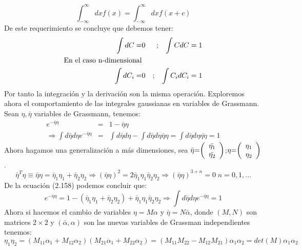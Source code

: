 \begin{equation}
\int_{-\infty}^{\infty}dxf(x)=\int_{-\infty}^{\infty}dxf(x+c)
\end{equation}
De este requerimiento se concluye que debemos tener:
\begin{eqnarray}
\int dC=&0&; \hspace{0.3 cm} \int CdC=1\\
\nonumber \text{En el caso n-dimensional}&&\\
\int dC_i=&0&; \hspace{0.3 cm} \int C_idC_i=1
\end{eqnarray}
Por tanto la integración y la derivación son la misma operación. Exploremos ahora el comportamiento de las integrales gaussianas en variables de Grassmann. Sean $\eta,\bar{\eta}$ variables de Grassmann, tenemos:
\begin{eqnarray}
e^{-\bar{\eta}\eta}&=&1-\bar{\eta}\eta\\
\Rightarrow\int d\bar{\eta}d\eta e^{-\bar{\eta}\eta}&=&\int d\bar{\eta}d\eta-\int d\bar{\eta}d\eta\bar{\eta}\eta=\int d\bar{\eta}d\eta\bar{\eta\eta}=1
\end{eqnarray}
Ahora hagamos una generalización a más dimensiones, sea $\text{\ensuremath{\bar{\eta}}=\ensuremath{\left(\begin{array}{c}
\bar{\eta_{1}}\\
\bar{\eta_{2}}
\end{array}\right)}}$;$\text{\ensuremath{\eta}=\ensuremath{\left(\begin{array}{c}
\eta_{1}\\
\eta_{2}
\end{array}\right)}}$.
\begin{equation}
\bar{\eta}^T\eta\equiv \bar{\eta}\eta=\bar{\eta}_1\eta_1+\bar{\eta}_2\eta_2\Rightarrow (\bar{\eta}\eta)^2=2\bar{\eta}_1\eta_1\bar{\eta}_2\eta_2\Rightarrow (\bar{\eta}\eta)^{3+n}=0 \;n=0,1,... 
\end{equation}
De la ecuación (2.158) podemos concluir que:
\begin{equation}
e^{-\bar{\eta}\eta}=1-(\bar{\eta}_1\eta_1+\bar{\eta}_2\eta_2)+\bar{\eta}_1\eta_1\bar{\eta}_2\eta_2\Rightarrow \int d\bar{\eta}d\eta e^{-\bar{\eta}\eta}=1
\end{equation}
Ahora si hacemos el cambio de variables $\eta=M\alpha$ y $\bar{\eta}=N\bar{\alpha}$, donde $(M,N)$ son matrices $2\times 2$ y $(\bar{\alpha},\alpha)$ son las nuevas variables de Grassman independientes tenemos:
\begin{equation}
\eta_{1}\eta_{2}=(M_{11}\alpha_{1}+M_{12}\alpha_{2})(M_{21}\alpha_{1}+M_{22}\alpha_{2})=(M_{11}M_{22}-M_{12}M_{21})\alpha_{1}\alpha_{2}=det(M)\alpha_{1}\alpha_{2}
\end{equation}

